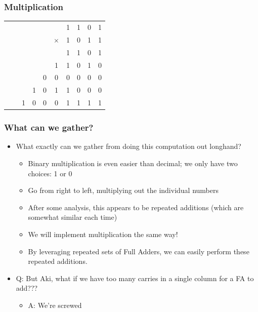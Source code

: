 \documentclass{beamer}
\begin{document}
    	
    	\begin{frame}
    		\frametitle{Multiplication}

			\centering    		
    		
    		{\Huge
			\begin{tabular}{c@{\,}c@{\,}c@{\,}c@{\,}c@{\,}c@{\,}c@{\,}c@{\,}c@{\,}c}
					   & &  &  &  &  & 1 & 1 & 0 & 1 \\
					   & &  &  &  & $\times$ & 1 & 0 & 1 & 1 \\
					   \hline
					   & &  &  &  &   & 1 & 1 & 0 & 1 \\
					   & &  &  &  & 1 & 1 & 0 & 1 & {\color{red}0} \\
					   & &  &  & 0 & 0 & 0 & 0 & {\color{red}0} & {\color{red}0} \\
					   & &  & 1 & 0 & 1 & 1 & {\color{red}0} & {\color{red}0} & {\color{red}0} \\
					   \hline
					    &  & 1 & 0 & 0 & 0 & 1 & 1 & 1 & 1
					
					
			\end{tabular}}
			\vfill
    	\end{frame}
    	
    	
    	\begin{frame}
    		\frametitle{What can we gather?}
    		\begin{itemize}
    			\item What exactly can we gather from doing this computation out longhand?
    			\begin{itemize}
    				\item Binary multiplication is even easier than decimal; we only have two choices: 1 or 0
    				\item Go from right to left, multiplying out the individual numbers
    				\item After some analysis, this appears to be repeated additions (which are somewhat similar each time)
    				\item We will implement multiplication the same way!
    				\item By leveraging repeated sets of Full Adders, we can easily perform these repeated additions.
    			\end{itemize}
    			\item Q: But Aki, what if we have too many carries in a single column for a FA to add???
    			\begin{itemize}
    				\item A: We're screwed
    			\end{itemize}
    		\end{itemize}
    	\end{frame}
    	
\end{document}
